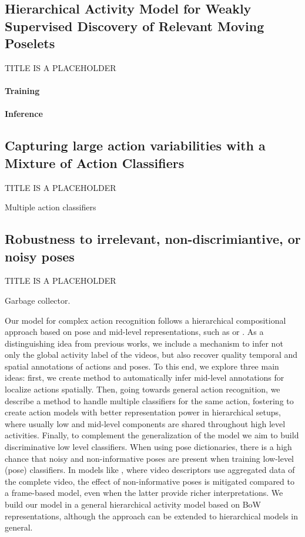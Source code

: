 \subsection{Hierarchical Activity Model for Weakly Supervised Discovery of
Relevant Moving Poselets}
TITLE IS A PLACEHOLDER

\paragraph{Training}

\paragraph{Inference}

\subsection{Capturing large action variabilities with a Mixture of Action
Classifiers}
TITLE IS A PLACEHOLDER

Multiple action classifiers

\subsection{Robustness to irrelevant, non-discrimiantive, or noisy poses}
TITLE IS A PLACEHOLDER

Garbage collector.



Our model for complex action recognition follows a hierarchical compositional
approach based on pose and mid-level representations, such as \cite{Lillo2014}
or \cite{Tao2015} .  As a distinguishing idea from previous works, we include a
mechanism to infer not only the global activity label of the videos, but also
recover quality temporal and spatial annotations of actions and poses. To this
end, we explore three main ideas: first, we create method to automatically
infer mid-level annotations for localize actions spatially. Then, going towards
general action recognition, we describe a method to handle multiple classifiers
for the same action, fostering to create action models with better
representation power in hierarchical setups, where usually low and mid-level
components are shared throughout high level activities. Finally, to complement
the generalization of the model we aim to build discriminative low level
classifiers. When using pose dictionaries, there is a high chance that noisy
and non-informative poses are present when training low-level (pose)
classifiers. In models like  \cite{Tao2015}, where  video descriptors use
aggregated data of the complete video, the effect of non-informative poses is
mitigated compared to a frame-based model, even when the latter provide richer
interpretations. We build our model in a general hierarchical activity model
based on BoW representations, although the approach can be extended to
hierarchical models in general.







